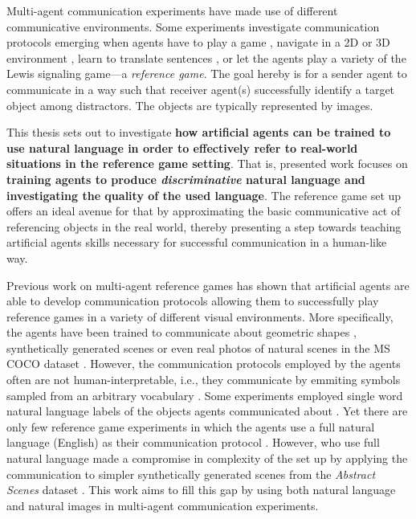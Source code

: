 Multi-agent communication experiments have made use of different communicative environments. Some experiments investigate communication protocols emerging when agents have to play a game \parencite{jacob2021multitasking}, navigate in a 2D or 3D environment \parencite{das2019tarmac, jaques2019social}, learn to translate sentences \parencite{lee2019countering}, or let the agents play a variety of the Lewis signaling game---a \textit{reference game}. The goal hereby is for a sender agent to communicate in a way such that receiver agent(s) successfully identify a target object among distractors. The objects are typically represented by images. 

This thesis sets out to investigate \textbf{how artificial agents can be trained to use natural language in order to effectively refer to real-world situations in the reference game setting}. That is, presented work focuses on \textbf{training agents to produce \textit{discriminative} natural language and investigating the quality of the used language}. The reference game set up offers an ideal avenue for that by approximating the basic communicative act of referencing objects in the real world, thereby presenting a step towards teaching artificial agents skills necessary for successful communication in a human-like way. 

Previous work on multi-agent reference games has shown that artificial agents are able to develop communication protocols allowing them to successfully play reference games in a variety of different visual environments. More specifically, the agents have been trained to communicate about geometric shapes \parencite{ohmer2021and}, synthetically generated scenes \parencite{lazaridou2020multi} or even real photos of natural scenes in the MS COCO dataset \parencite{lazaridou2016multi, lin2014microsoft, havrylov2017emergence}. However, the communication protocols employed by the agents often are not human-interpretable, i.e., they communicate by emmiting symbols sampled from an arbitrary vocabulary \parencite{foerster2016learning, lazaridou2016multi}. Some experiments employed single word natural language labels of the objects agents communicated about \parencite{lazaridou2016multi}. Yet there are only few reference game experiments in which the agents use a full natural language (English) as their communication protocol \parencite[e.g.,][]{lazaridou2020multi}. However, \cite{lazaridou2020multi} who use full natural language made a compromise in complexity of the set up by applying the communication to simpler synthetically generated scenes from the \textit{Abstract Scenes} dataset \parencite{zitnick2013bringing}. This work aims to fill this gap by using both natural language and natural images in multi-agent communication experiments. 

